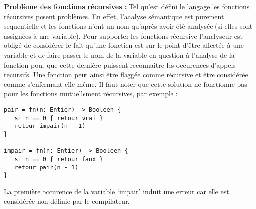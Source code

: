 \hfill\break
\textbf{Problème des fonctions récursives :}
Tel qu'est défini le langage les fonctions récursives posent problèmes. En effet,
l'analyse sémantique est purement sequentielle et les fonctions n'ont un nom qu'après
avoir été analysée (si elles sont assignées à une variable). Pour supporter les fonctions
récursive l'analyseur est obligé de considérer le fait qu'une fonction est sur le
point d'être affectée à une variable et de faire passer le nom de la variable en question
à l'analyse de la fonction pour que cette dernière puissent reconnaitre les occurences
d'appels recursifs. Une fonction peut ainsi être flaggée comme récursive et être
considérée comme s'enfermant elle-même.
Il faut noter que cette solution ne fonctionne pas pour les fonctions mutuellement
récursives, par exemple :
\begin{verbatim}
pair = fn(n: Entier) -> Booleen {
   si n == 0 { retour vrai }
   retour impair(n - 1)
}

impair = fn(n: Entier) -> Booleen {
   si n == 0 { retour faux }
   retour pair(n - 1)
}
\end{verbatim}
La première occurence de la variable `impair' induit une erreur car elle est considérée
non définie par le compilateur.
